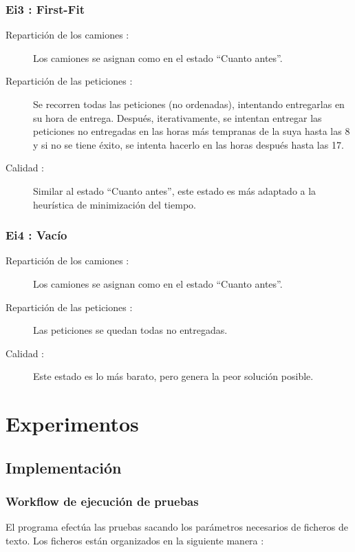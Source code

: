 \documentclass{article}
\begin{document}
\subsubsection{Ei3 : First-Fit}

\begin{description}
\item[Repartición de los camiones :] Los camiones se asignan como en el estado
``Cuanto antes''.
\item[Repartición de las peticiones :] Se recorren todas las peticiones (no
ordenadas), intentando entregarlas en su hora de entrega. Después,
iterativamente, se intentan entregar las peticiones no entregadas en las horas
más tempranas de la suya hasta las 8 y si no se tiene éxito, se intenta hacerlo
en las horas después hasta las 17.
\item[Calidad :] Similar al estado ``Cuanto antes'', este estado es más adaptado
a la heurística de minimización del tiempo.
\end{description}

\subsubsection{Ei4 : Vacío}

\begin{description}
\item[Repartición de los camiones :] Los camiones se asignan como en el estado
``Cuanto antes''.
\item[Repartición de las peticiones :] Las peticiones se quedan todas no
entregadas.
\item[Calidad :] Este estado es lo más barato, pero genera la peor solución
posible.
\end{description}

\newpage

\section{Experimentos}

\subsection{Implementación}

\subsubsection{Workflow de ejecución de pruebas}

El programa efectúa las pruebas sacando los parámetros necesarios de ficheros de
texto. Los ficheros están organizados en la siguiente manera :
\end{document}

